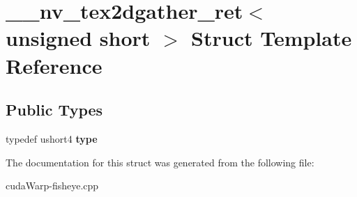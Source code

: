 \hypertarget{struct____nv__tex2dgather__ret_3_01unsigned_01short_01_4}{}\section{\+\_\+\+\_\+nv\+\_\+tex2dgather\+\_\+ret$<$ unsigned short $>$ Struct Template Reference}
\label{struct____nv__tex2dgather__ret_3_01unsigned_01short_01_4}
\subsection*{Public Types}
\begin{DoxyCompactItemize}
\item 
typedef ushort4 {\bfseries type}\hypertarget{struct____nv__tex2dgather__ret_3_01unsigned_01short_01_4_a8d8424cef688b005ac9e06ab04268b87}{}\label{struct____nv__tex2dgather__ret_3_01unsigned_01short_01_4_a8d8424cef688b005ac9e06ab04268b87}

\end{DoxyCompactItemize}


The documentation for this struct was generated from the following file\+:\begin{DoxyCompactItemize}
\item 
cuda\+Warp-\/fisheye.\+cpp\end{DoxyCompactItemize}
